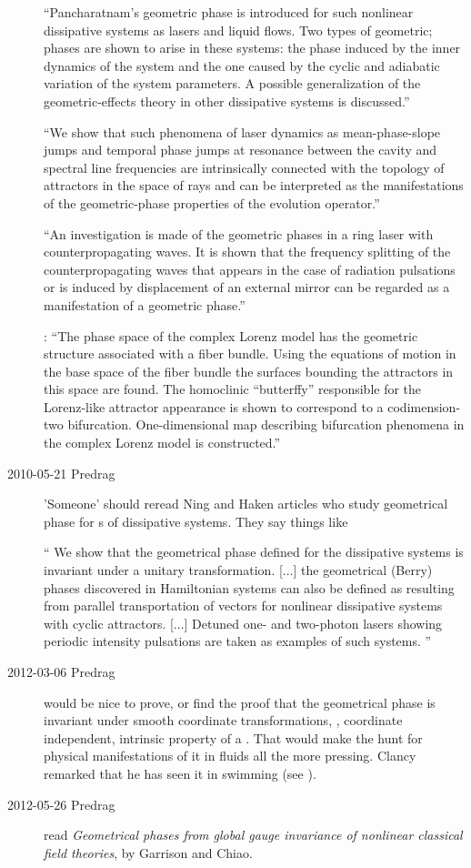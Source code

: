\begin{description}
``Pancharatnam's geometric phase is introduced for such nonlinear
   dissipative systems as lasers and liquid flows. Two types of geometric;
   phases are shown to arise in these systems: the phase induced by the
   inner dynamics of the system and the one caused by the cyclic and
   adiabatic variation of the system parameters. A possible generalization
   of the geometric-effects theory in other dissipative systems is
   discussed.''

``We show that such phenomena of laser dynamics as
mean-phase-slope jumps and temporal phase jumps at resonance between the
cavity and spectral line frequencies are intrinsically connected with the
topology of attractors in the space of rays and can be interpreted as the
manifestations of the geometric-phase properties of the evolution
operator.''

``An investigation is made of the geometric phases in a ring laser with
   counterpropagating waves. It is shown that the frequency splitting of
   the counterpropagating waves that appears in the case of radiation
   pulsations or is induced by displacement of an external mirror can be
   regarded as a manifestation of a geometric phase.''

:
``The phase space of the complex Lorenz model has the
   geometric structure associated with a fiber bundle. Using the equations
   of motion in the base space of the fiber bundle the surfaces bounding
   the attractors in this space are found. The homoclinic ``butterffy''
   responsible for the Lorenz-like attractor appearance is shown to
   correspond to a codimension-two bifurcation. One-dimensional map
   describing bifurcation phenomena in the complex Lorenz model is
   constructed.''

\item[2010-05-21 Predrag] 'Someone' should reread
Ning and Haken articles who
study geometrical phase
for \rpo s of dissipative systems.
They say things like

``
We show that the geometrical phase defined for the dissipative systems is
invariant under a unitary transformation. [...] the geometrical {(Berry)}
phases discovered in Hamiltonian systems can also be defined as resulting
from parallel transportation of vectors for nonlinear dissipative systems
with cyclic attractors.  [...] Detuned one- and two-photon lasers showing
periodic intensity pulsations are taken as examples of such systems.
''

\item[2012-03-06 Predrag] would be nice to prove, or find the proof that
the geometrical phase is invariant under smooth coordinate
transformations, \ie, coordinate independent, intrinsic property of a
\rpo. That would make the hunt for physical manifestations of it in
fluids all the more pressing. Clancy remarked that he has seen it in swimming
(see ).

\item[2012-05-26 Predrag] read
{\it Geometrical phases from global gauge invariance of nonlinear
classical field theories}, by Garrison and Chiao.



\end{description}
